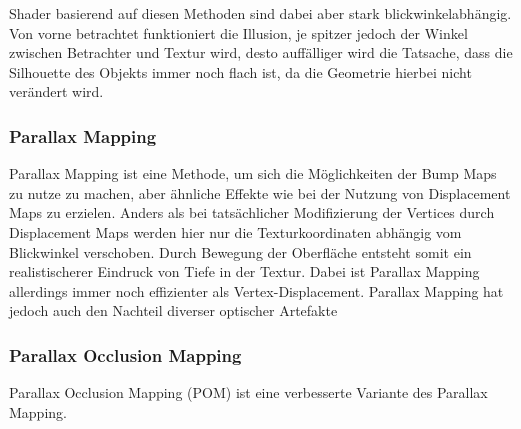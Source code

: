 Shader basierend auf diesen Methoden sind dabei aber stark blickwinkelabhängig.
Von vorne betrachtet funktioniert die Illusion, je spitzer jedoch der Winkel zwischen Betrachter und Textur
wird, desto auffälliger wird die Tatsache, dass die Silhouette des Objekts immer noch flach ist, 
da die Geometrie hierbei nicht verändert wird. 








\subsubsection{Parallax Mapping}

Parallax Mapping ist eine Methode, um sich die Möglichkeiten der Bump Maps zu nutze zu machen, aber ähnliche Effekte
wie bei der Nutzung von Displacement Maps zu erzielen. Anders als bei tatsächlicher Modifizierung der Vertices 
durch Displacement Maps werden hier nur die Texturkoordinaten abhängig vom Blickwinkel verschoben. \parencite{Kaneko2001}
Durch Bewegung der Oberfläche entsteht somit ein realistischerer Eindruck von Tiefe in der Textur. Dabei ist Parallax Mapping
allerdings immer noch effizienter als Vertex-Displacement. Parallax Mapping hat jedoch auch den Nachteil 
diverser optischer Artefakte


\subsubsection{Parallax Occlusion Mapping}

Parallax Occlusion Mapping (POM) ist eine verbesserte Variante des Parallax Mapping. 
\parencite{Tatarchuk2006}




